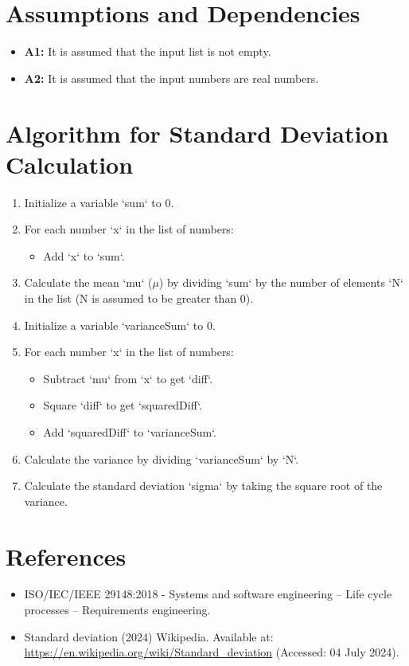 \documentclass{article}
\begin{document}
\section{Assumptions and Dependencies}
\begin{itemize}
\item \textbf{A1:} It is assumed that the input list is not empty.
\item \textbf{A2:} It is assumed that the input numbers are real numbers.
\end{itemize}

\section{Algorithm for Standard Deviation Calculation}

\begin{enumerate}
\item Initialize a variable `sum` to 0.
\item For each number `x` in the list of numbers:
    \begin{itemize}
    \item Add `x` to `sum`.
    \end{itemize}
\item Calculate the mean `mu` ($\mu$) by dividing `sum` by the number of elements `N` in the list (N is assumed to be greater than 0).
\item Initialize a variable `varianceSum` to 0.
\item For each number `x` in the list of numbers:
    \begin{itemize}
    \item Subtract `mu` from `x` to get `diff`.
    \item Square `diff` to get `squaredDiff`.
    \item Add `squaredDiff` to `varianceSum`.
    \end{itemize}
\item Calculate the variance by dividing `varianceSum` by `N`.
\item Calculate the standard deviation `sigma` by taking the square root of the variance.
\end{enumerate}

\section{References}
\begin{itemize}
\item ISO/IEC/IEEE 29148:2018 - Systems and software engineering -- Life cycle processes -- Requirements engineering.
\item Standard deviation (2024) Wikipedia. Available at: \url{https://en.wikipedia.org/wiki/Standard_deviation} (Accessed: 04 July 2024).
\end{itemize}
\end{document}
